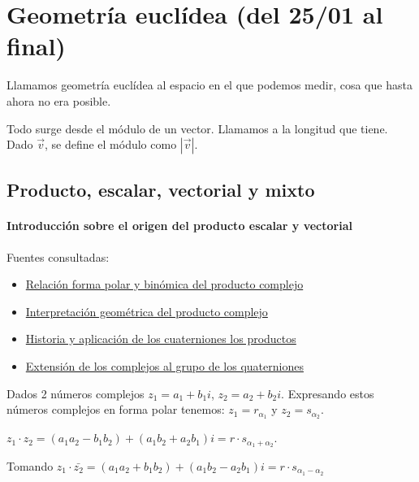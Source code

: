 
\section{Geometría euclídea (del 25/01 al final)}

Llamamos geometría euclídea al espacio en el que podemos medir, cosa que hasta ahora no era posible.

Todo surge desde el módulo de un vector. Llamamos  a la longitud que tiene. Dado $\vec{v}$, se define el módulo como $|\vec{v}|$.

\subsection{Producto, escalar, vectorial y mixto}

\paragraph{Introducción sobre el origen del producto escalar y vectorial}

Fuentes consultadas:
\begin{itemize}
  \item \href{http://www.suitcaseofdreams.net/Geometric_multiplication.htm}{Relación forma polar y binómica del producto complejo}
  \vspace{-0.4cm}
  \item \href{https://www2.clarku.edu/faculty/djoyce/complex/mult.html}{Interpretación geométrica del producto complejo}
  \vspace{-0.4cm}
  \item \href{https://www.quora.com/Who-invented-the-dot-product-and-cross-product}{Historia y aplicación de los cuaterniones los productos}
  \vspace{-0.4cm}
  \item \href{https://es.wikipedia.org/wiki/Cuaterni%C3%B3n}{ Extensión de los complejos al grupo de los quaterniones}
\end{itemize}

Dados 2 números complejos $z_1 = a_1+b_1i$, $z_2 = a_2+b_2i$. Expresando estos números complejos en forma polar tenemos: $z_1=r_{\alpha_1}$ y $z_2 = s_{\alpha_2}$.  

$z_1·z_2 = (a_1a_2 - b_1b_2) + (a_1b_2+a_2b_1)i = r·s_{\alpha_1+\alpha_2}$.

Tomando $z_1·\bar{z_2} = (a_1a_2 + b_1b_2) + (a_1b_2-a_2b_1)i = r·s_{\alpha_1-\alpha_2}
$

